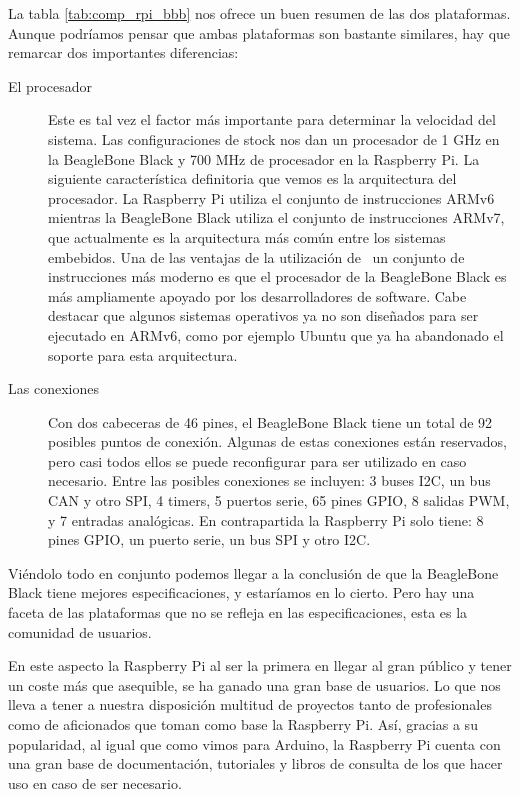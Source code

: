 La tabla \ref{tab:comp_rpi_bbb}  nos ofrece un buen resumen de las dos plataformas. Aunque podríamos pensar que ambas plataformas son bastante similares, hay que remarcar dos importantes diferencias:
\begin{description}
\item[El procesador] Este es tal vez el factor más importante para determinar la velocidad del sistema. Las configuraciones de stock nos dan un procesador de 1 GHz en la BeagleBone Black y 700 MHz de procesador en la Raspberry Pi. La siguiente característica definitoria que vemos es la arquitectura del procesador. La Raspberry Pi utiliza el conjunto de instrucciones ARMv6 mientras la BeagleBone Black utiliza el conjunto de instrucciones ARMv7, que actualmente es la arquitectura más común entre los sistemas embebidos. Una de las ventajas de la utilización de \ un conjunto de instrucciones más moderno es que el procesador de la BeagleBone Black es más ampliamente apoyado por los desarrolladores de software. Cabe destacar que algunos sistemas operativos ya no son diseñados para ser ejecutado en ARMv6, como por ejemplo Ubuntu que ya ha abandonado el soporte para esta arquitectura.
\item[Las conexiones] Con dos cabeceras de 46 pines, el BeagleBone Black tiene un total de 92 posibles puntos de conexión. Algunas de estas conexiones están reservados, pero casi todos ellos se puede reconfigurar para ser utilizado en caso necesario. Entre las posibles conexiones se incluyen: 3 buses I2C, un bus CAN y otro SPI, 4 timers, 5 puertos serie, 65 pines GPIO, 8 salidas PWM, y 7 entradas analógicas. En contrapartida la Raspberry Pi solo tiene: 8 pines GPIO, un puerto serie, un bus SPI y otro I2C.
\end{description}



Viéndolo todo en conjunto podemos llegar a la conclusión de que la BeagleBone Black tiene mejores especificaciones, y estaríamos en lo cierto. Pero hay una faceta de las plataformas que no se refleja en las especificaciones, esta es la comunidad de usuarios.



En este aspecto la Raspberry Pi al ser la primera en llegar al gran público y tener un coste más que asequible, se ha ganado una gran base de usuarios. Lo que nos lleva a tener a nuestra disposición multitud de proyectos tanto de profesionales como de aficionados que toman como base la Raspberry Pi. Así, gracias a su popularidad, al igual que como vimos para Arduino, la Raspberry Pi cuenta con una gran base de documentación, tutoriales y libros de consulta de los que hacer uso en caso de ser necesario.



